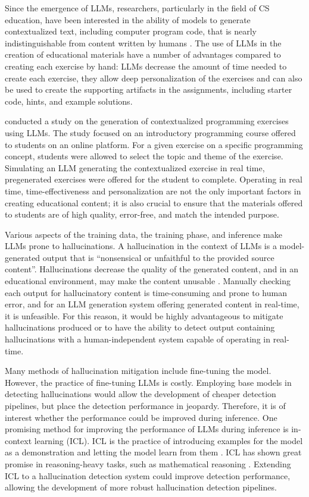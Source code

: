 \documentclass[english, 12pt, a4paper, sci, utf8, a-2b, online]{latex/definitions/aaltothesis}
\begin{document}
Since the emergence of LLMs, researchers, particularly in the field of CS education, have been interested in the ability of models to generate contextualized text, including computer program code, that is nearly indistinguishable from content written by humans \cite{10.1145/3545945.3569759}. The use of LLMs in the creation of educational materials have a number of advantages compared to creating each exercise by hand: LLMs decrease the amount of time needed to create each exercise, they allow deep personalization of the exercises and can also be used to create the supporting artifacts in the assignments, including starter code, hints, and example solutions.

\textcite{10.1145/3632620.3671103} conducted a study on the generation of contextualized programming exercises using LLMs. The study focused on an introductory programming course offered to students on an online platform. For a given exercise on a specific programming concept, students were allowed to select the topic and theme of the exercise. Simulating an LLM generating the contextualized exercise in real time, pregenerated exercises were offered for the student to complete. Operating in real time, time-effectiveness and personalization are not the only important factors in creating educational content; it is also crucial to ensure that the materials offered to students are of high quality, error-free, and match the intended purpose.

Various aspects of the training data, the training phase, and inference make LLMs prone to hallucinations. A hallucination in the context of LLMs is a model-generated output that is ``nonsensical or unfaithful to the provided source content''\cite{10.1145/3703155}. Hallucinations decrease the quality of the generated content, and in an educational environment, may make the content unusable \cite{10.1145/3769994.3770036}. Manually checking each output for hallucinatory content is time-consuming and prone to human error, and for an LLM generation system offering generated content in real-time, it is unfeasible. For this reason, it would be highly advantageous to mitigate hallucinations produced or to have the ability to detect output containing hallucinations with a human-independent system capable of operating in real-time. 

Many methods of hallucination mitigation include fine-tuning the model. However, the practice of fine-tuning LLMs is costly. Employing base models in detecting hallucinations would allow the development of cheaper detection pipelines, but place the detection performance in jeopardy. Therefore, it is of interest whether the performance could be improved during inference. One promising method for improving the performance of LLMs during inference is in-context learning (ICL). ICL is the practice of introducing examples for the model as a demonstration and letting the model learn from them \cite{dong-etal-2024-survey}. ICL has shown great promise in reasoning-heavy tasks, such as mathematical reasoning \cite{an2024learningmistakesmakesllm}. Extending ICL to a hallucination detection system could improve detection performance, allowing the development of more robust hallucination detection pipelines.
\end{document}
